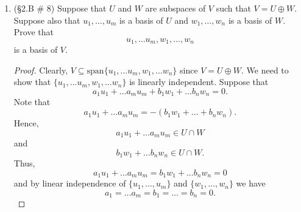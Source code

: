 \documentclass[12pt,letterpaper]{article}
\theoremstyle{plain}
\theoremstyle{definition}
\begin{document}
\begin{enumerate}[1.]
\item (\S 2.B \# 8) Suppose that $U$ and $W$ are subspaces of $V$ such that $V=U\oplus W$. Suppose also that $u_1, \ldots ,u_m$ is a basis of $U$ and $w_1, \ldots , w_n$ is a basis of $W$. Prove that 
\[u_1, \ldots u_m, w_1, \ldots, w_n\]
is a basis of $V$.
\begin{proof} Clearly, $V\subseteq \text{span}\{u_1,\ldots u_m, w_1,\ldots w_n\}$ since $V=U\oplus W$. We need to show that $\{u_1, \ldots u_m, w_1, \ldots w_n\}$ is linearly independent. Suppose that 
\[a_1u_1+\ldots a_mu_m+b_1w_1+\ldots b_nw_n=0.\] Note that 
\[a_1u_1+\ldots a_mu_m=-(b_1w_1+\ldots +b_nw_n).\] 
Hence,
\[a_1u_1+\ldots a_mu_m\in U\cap W\]
and 
\[b_1w_1+\ldots b_nw_n\in U\cap W.\] 
Thus, 
\[a_1u_1+\ldots a_mu_m=b_1w_1+\ldots b_nw_n=0\] and by linear independence of $\{u_1, \ldots ,u_m\}$  and $\{w_1, \ldots , w_n\}$  we have 
\[a_1=\ldots a_m=b_1=\ldots =b_n=0.\]
\end{proof} 
\end{enumerate}
\end{document}
